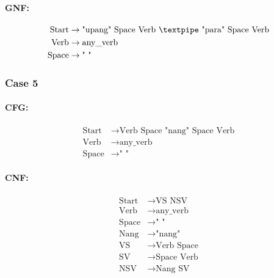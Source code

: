 \paragraph{GNF:}

\begin{equation*}
    \begin{aligned}
        \text{Start} &\rightarrow \text{"upang" Space Verb {\textpipe} "para" Space Verb} \\
        \text{Verb} &\rightarrow \text{any\_verb} \\
        \text{Space} &\rightarrow \text{" "}
    \end{aligned}
\end{equation*}


\subsubsection{Case 5}

\paragraph{CFG:}

\begin{equation*}
    \begin{aligned}
        \text{Start} &\rightarrow \text{Verb Space "nang" Space Verb} \\
        \text{Verb} &\rightarrow \text{any\_verb} \\
        \text{Space} &\rightarrow \text{" "}
    \end{aligned}
\end{equation*}

\paragraph{CNF:}

\begin{equation*}
    \begin{aligned}
        \text{Start} &\rightarrow \text{VS NSV} \\
        \text{Verb} &\rightarrow \text{any\_verb} \\
        \text{Space} &\rightarrow \text{" "} \\
        \text{Nang} &\rightarrow \text{"nang"} \\
        \text{VS} &\rightarrow \text{Verb Space} \\
        \text{SV} &\rightarrow \text{Space Verb} \\
        \text{NSV} &\rightarrow \text{Nang SV}
    \end{aligned}
\end{equation*}

